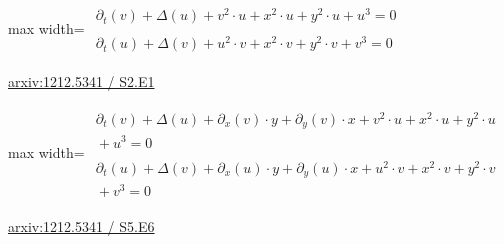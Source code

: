 \documentclass[UTF8,10pt,a4paper,fontset=mac]{ctexart}
\begin{document}
\begin{minipage}{\linewidth}\begin{center}\begin{adjustbox}{max width=\linewidth}$\displaystyle\begin{gathered}\begin{gathered}\partial_{t}(v)+\Delta(u)+v^{2}\cdot u+x^{2}\cdot u+y^{2}\cdot u+u^{3}=0\end{gathered}\\[5pt]\begin{gathered}\partial_{t}(u)+\Delta(v)+u^{2}\cdot v+x^{2}\cdot v+y^{2}\cdot v+v^{3}=0\end{gathered}\end{gathered}$\end{adjustbox}\end{center}{\small\href{https://arxiv.org/html/1212.5341#S2.E1}{arxiv:1212.5341 / S2.E1}}\par\end{minipage}\par\vspace{6mm}

\begin{minipage}{\linewidth}\begin{center}\begin{adjustbox}{max width=\linewidth}$\displaystyle\begin{gathered}\begin{gathered}\partial_{t}(v)+\Delta(u)+\partial_{x}(v)\cdot y+\partial_{y}(v)\cdot x+v^{2}\cdot u+x^{2}\cdot u+y^{2}\cdot u\\[-1pt]{}+u^{3}=0\end{gathered}\\[5pt]\begin{gathered}\partial_{t}(u)+\Delta(v)+\partial_{x}(u)\cdot y+\partial_{y}(u)\cdot x+u^{2}\cdot v+x^{2}\cdot v+y^{2}\cdot v\\[-1pt]{}+v^{3}=0\end{gathered}\end{gathered}$\end{adjustbox}\end{center}{\small\href{https://arxiv.org/html/1212.5341#S5.E6}{arxiv:1212.5341 / S5.E6}}\par\end{minipage}\par\vspace{6mm}
\end{document}
